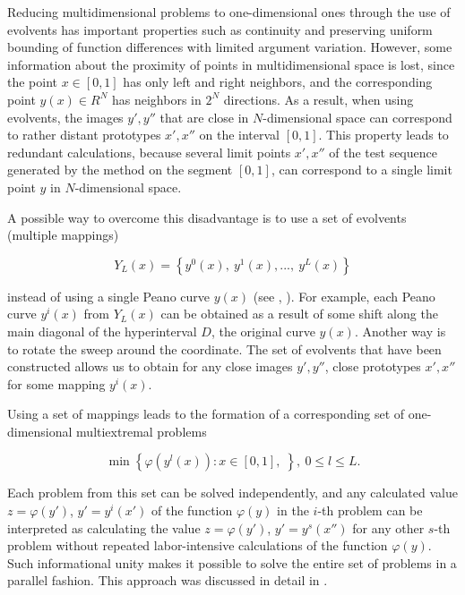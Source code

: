 \documentclass{svproc}
\begin{document}
Reducing multidimensional problems to one-dimensional ones through the use of evolvents has important properties such as continuity and preserving uniform bounding of function differences with limited argument variation. However, some information about the proximity of points in multidimensional space is lost, since the point \(x\in [0,1]\) has only left and right neighbors, and the corresponding point \(y(x) \in R^N\) has neighbors in \(2^N\) directions. As a result, when using evolvents, the images \(y' , y''\) that are close in \(N\)-dimensional space can correspond to rather distant prototypes \(x' , x''\) on the interval \([0,1]\). This property leads to redundant calculations, because several limit points \(x' , x''\) of the test sequence generated by the method on the segment \([0,1]\), can correspond to a single limit point \(y\) in \(N\)-dimensional space.

A possible way to overcome this disadvantage is to use a set of evolvents (multiple mappings)

\begin{displaymath}
\label{eq:142}
Y_L(x)=\left\{y^0(x),\ y^1(x),...,\ y^L(x)\right\}
\end{displaymath}

instead of using a single Peano curve \(y(x)\) (see \cite{Strongin1992}, \cite{Strongin2000}). For example, each Peano curve \(y^i(x)\) from \(Y_L(x)\) can be obtained as a result of some shift along the main diagonal of the hyperinterval \(D\), the original curve \(y(x)\). Another way is to rotate the sweep around the coordinate. The set of evolvents that have been constructed allows us to obtain for any close images \(y', y''\), close prototypes \(x', x''\) for some mapping \(y^i(x)\).

   Using a set of mappings leads to the formation of a corresponding set of one-dimensional multiextremal problems

\begin{displaymath}
\label{6_problem_l}
\min{\left\{\varphi(y^l(x)):x\in [0,1], \;  \right\}}, \ 0 \leq l \leq L.
\end{displaymath}

Each problem from this set can be solved independently, and any calculated value \(z= \varphi(y')\), \(y'=y^i(x')\) of the function \(\varphi(y)\) in the \(i\)-th problem can be interpreted as calculating the value \(z= \varphi(y')\), \(y'=y^s(x'')\) for any other \(s\)-th problem without repeated labor-intensive calculations of the function \(\varphi(y)\). Such informational unity makes it possible to solve the entire set of problems in a parallel fashion. This approach was discussed in detail in \cite{Barkalov2019}.
\end{document}

